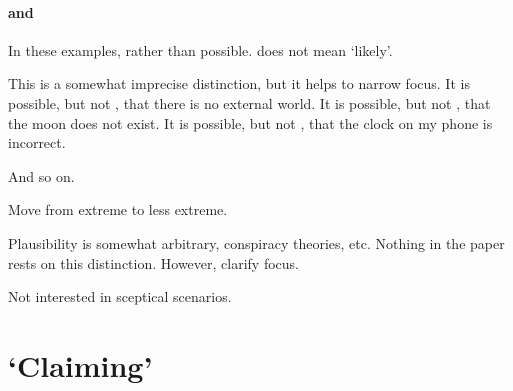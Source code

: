 \paragraph{ and }

\begin{note}
  In these examples,  rather than possible.
   does not mean `likely'.

  This is a somewhat imprecise distinction, but it helps to narrow focus.
  It is possible, but not , that there is no external world.
  It is possible, but not , that the moon does not exist.
  It is possible, but not , that the clock on my phone is incorrect.

  And so on.

  Move from extreme to less extreme.

  Plausibility is somewhat arbitrary, conspiracy theories, etc.
  Nothing in the paper rests on this distinction.
  However, clarify focus.
\end{note}

\begin{note}
  Not interested in sceptical scenarios.
\end{note}

\section{`Claiming'}
\label{sec:claiming}

